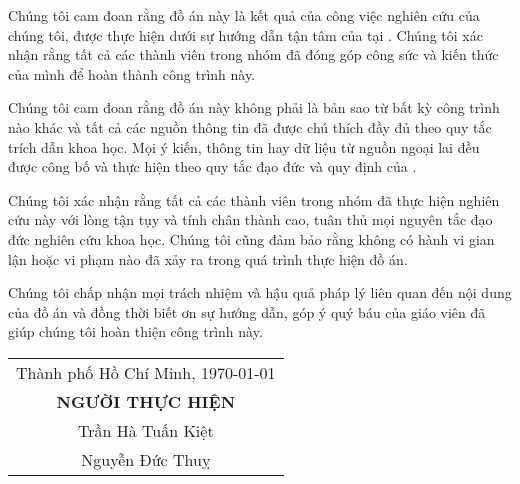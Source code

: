 \begin{declaration}

Chúng tôi cam đoan rằng đồ án này là kết quả của công việc nghiên cứu của chúng tôi, được thực hiện dưới sự hướng dẫn tận tâm của \Proc tại \Uni. Chúng tôi xác nhận rằng tất cả các thành viên trong nhóm đã đóng góp công sức và kiến thức của mình để hoàn thành công trình này.

Chúng tôi cam đoan rằng đồ án này không phải là bản sao từ bất kỳ công trình nào khác và tất cả các nguồn thông tin đã được chú thích đầy đủ theo quy tắc trích dẫn khoa học. Mọi ý kiến, thông tin hay dữ liệu từ nguồn ngoại lai đều được công bố và thực hiện theo quy tắc đạo đức và quy định của \Uni.

Chúng tôi xác nhận rằng tất cả các thành viên trong nhóm đã thực hiện nghiên cứu này với lòng tận tụy và tính chân thành cao, tuân thủ mọi nguyên tắc đạo đức nghiên cứu khoa học. Chúng tôi cũng đảm bảo rằng không có hành vi gian lận hoặc vi phạm nào đã xảy ra trong quá trình thực hiện đồ án.

Chúng tôi chấp nhận mọi trách nhiệm và hậu quả pháp lý liên quan đến nội dung của đồ án và đồng thời biết ơn sự hướng dẫn, góp ý quý báu của giáo viên \Proc đã giúp chúng tôi hoàn thiện công trình này.

\begin{flushright}

    \begin{tabular}{@{}c@{}}
    Thành phố Hồ Chí Minh, \today \\
    \textbf{NGƯỜI THỰC HIỆN} \\
    Trần Hà Tuấn Kiệt \\
    Nguyễn Đức Thuỵ
    \end{tabular}

\end{flushright}
\end{declaration}

\newpage


